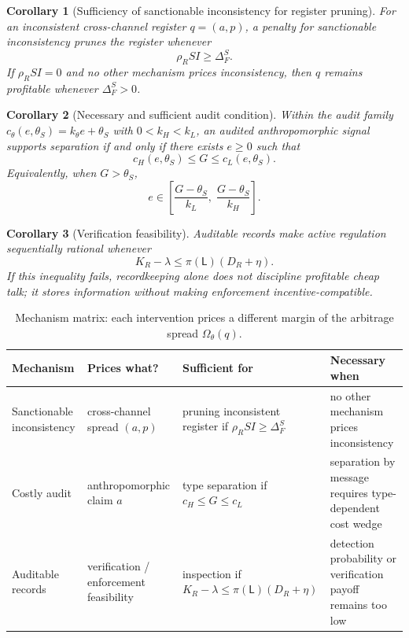 \documentclass[review,authoryear]{elsarticle}
\newtheorem{corollary}{Corollary}
\theoremstyle{definition}
\theoremstyle{plain}
\begin{document}
\begin{corollary}[Sufficiency of sanctionable inconsistency for register pruning]
\label{cor:inconsistency-pruning}
For an inconsistent cross-channel register $q=(a,p)$, a
penalty for sanctionable inconsistency prunes the register whenever
\[
\rho_R SI \ge \Delta_F^S.
\]
If $\rho_R SI=0$ and no other mechanism prices inconsistency, then $q$
remains profitable whenever $\Delta_F^S>0$.
\end{corollary}

\begin{corollary}[Necessary and sufficient audit condition]
\label{cor:audit-separation}
Within the audit family $c_\theta(e,\theta_S)=k_\theta e+\theta_S$ with
$0<k_H<k_L$, an audited anthropomorphic signal supports separation if and
only if there exists $e\ge 0$ such that
\[
c_H(e,\theta_S)\le G\le c_L(e,\theta_S).
\]
Equivalently, when $G>\theta_S$,
\[
e\in
\left[
\frac{G-\theta_S}{k_L},\;
\frac{G-\theta_S}{k_H}
\right].
\]
\end{corollary}

\begin{corollary}[Verification feasibility]
\label{cor:verification-feasibility}
Auditable records make active regulation sequentially rational whenever
\[
K_R-\lambda \le \pi(\mathsf{L})(D_R+\eta).
\]
If this inequality fails, recordkeeping alone does not discipline profitable
cheap talk; it stores information without making enforcement
incentive-compatible.
\end{corollary}

\begin{table}[t]
\centering
\footnotesize
\setlength{\tabcolsep}{3pt}
\renewcommand{\arraystretch}{1.3}
\begin{tabular}{@{}p{2.6cm}p{2.6cm}p{2.9cm}p{2.9cm}@{}}
\toprule
\textbf{Mechanism} & \textbf{Prices what?} & \textbf{Sufficient for} & \textbf{Necessary when} \\
\midrule
Sanctionable inconsistency & cross-channel spread $(a,p)$ & pruning inconsistent register if $\rho_R SI\ge\Delta_F^S$ & no other mechanism prices inconsistency \\
Costly audit & anthropomorphic claim $a$ & type separation if $c_H\le G\le c_L$ & separation by message requires type-dependent cost wedge \\
Auditable records & verification / enforcement feasibility & inspection if $K_R{-}\lambda\le\pi(\mathsf{L})(D_R{+}\eta)$ & detection probability or verification payoff remains too low \\
\bottomrule
\end{tabular}
\caption{Mechanism matrix: each intervention prices a different margin of the
arbitrage spread $\Omega_\theta(q)$.}
\label{tab:mechanism-matrix}
\end{table}
\end{document}
